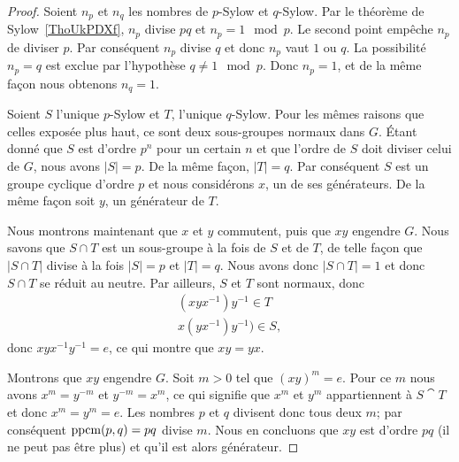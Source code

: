 \begin{proof}
    Soient \( n_p\) et \( n_q\) les nombres de \( p\)-Sylow et \( q\)-Sylow. Par le théorème de Sylow~\ref{ThoUkPDXf}, \( n_p\) divise \( pq\) et \( n_p=1\mod p\). Le second point empêche \( n_p\) de diviser \( p\). Par conséquent \( n_p\) divise \( q\) et donc \( n_p\) vaut \( 1\) ou \( q\). La possibilité \( n_p=q\) est exclue par l'hypothèse \( q\neq 1\mod p\). Donc \( n_p=1\), et de la même façon nous obtenons \( n_q=1\).

    Soient \( S\) l'unique \( p\)-Sylow et \( T\), l'unique \( q\)-Sylow. Pour les mêmes raisons que celles exposée plus haut, ce sont deux sous-groupes normaux dans \( G\). Étant donné que \( S\) est d'ordre \( p^n\) pour un certain \( n\) et que l'ordre de \( S\) doit diviser celui de \( G\), nous avons \( |S|=p\). De la même façon, \( | T |=q\). Par conséquent \( S\) est un groupe cyclique d'ordre \( p\) et nous considérons \( x\), un de ses générateurs. De la même façon soit \( y\), un générateur de \( T\).

    Nous montrons maintenant que \( x\) et \( y\) commutent, puis que \( xy\) engendre \( G\). Nous savons que \( S\cap T\) est un sous-groupe à la fois de \( S\) et de \( T\), de telle façon que \( | S\cap T |\) divise à la fois \( | S |=p\) et \( | T |=q\). Nous avons donc \( | S\cap T |=1\) et donc \( S\cap T\) se réduit au neutre. Par ailleurs, \( S\) et \( T\) sont normaux, donc
    \begin{subequations}
        \begin{align}
            (xyx^{-1})y^{-1}\in T\\
            x(yx^{-1})y^{-1})\in S,
        \end{align}
    \end{subequations}
    donc \( xyx^{-1}y^{-1}=e\), ce qui montre que \( xy=yx\).

    Montrons que \( xy\) engendre \( G\). Soit \( m>0\) tel que \( (xy)^m=e\). Pour ce \( m\) nous avons \( x^m=y^{-m}\) et \( y^{-m}=x^m\), ce qui signifie que \( x^m\) et \( y^m\) appartiennent à \( S\cat T\) et donc \( x^m=y^m=e\). Les nombres \( p\) et \( q\) divisent donc tous deux \( m\); par conséquent \( \operatorname{ppcm}(p,q)=pq\) divise \( m\). Nous en concluons que \( xy\) est d'ordre \( pq\) (il ne peut pas être plus) et qu'il est alors générateur.


\end{proof}
